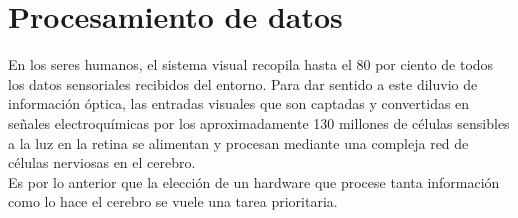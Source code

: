 

\section{Procesamiento de datos}
En los seres humanos, el sistema visual recopila hasta el 80 por ciento de todos los datos sensoriales recibidos del entorno. 
Para dar sentido a este diluvio de información óptica, las entradas visuales que son captadas y convertidas en señales 
electroquímicas por los aproximadamente 130 millones de células sensibles a la luz en la retina se alimentan y procesan mediante 
una compleja red de células nerviosas en el cerebro.~\cite{mundiario}\\
Es por lo anterior que la elección de un hardware que procese tanta información como lo hace el cerebro se vuele una tarea
prioritaria.
